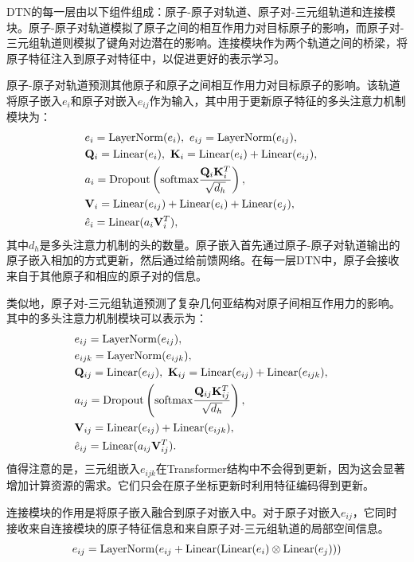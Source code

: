 DTN的每一层由以下组件组成：原子-原子对轨道、原子对-三元组轨道和连接模块。原子-原子对轨道模拟了原子之间的相互作用力对目标原子的影响，而原子对-三元组轨道则模拟了键角对边潜在的影响。连接模块作为两个轨道之间的桥梁，将原子特征注入到原子对特征中，以促进更好的表示学习。

原子-原子对轨道预测其他原子和原子之间相互作用力对目标原子的影响。该轨道将原子嵌入$e_i$和原子对嵌入$e_{ij}$作为输入，其中用于更新原子特征的多头注意力机制模块为：
\begin{eqnarray}
    &e_i = {\rm LayerNorm}(e_i), \ e_{ij} = {\rm LayerNorm}(e_{ij}),& \\
    &\mathbf{Q}_i = {\rm Linear}(e_i), \ \mathbf{K}_i = {\rm Linear}(e_i) + {\rm Linear}(e_{ij}),& \\
    &a_i = {\rm Dropout} \left({\rm softmax} \frac{\mathbf{Q}_i \mathbf{K}_i^T}{\sqrt{d_h}} \right), & \\
    &\mathbf{V}_i = {\rm Linear}(e_{ij}) + {\rm Linear}(e_{i}) + {\rm Linear}(e_{j}),& \\
    &\hat{e}_i = {\rm Linear}(a_i \mathbf{V}_i^T),&
\end{eqnarray}
其中$d_h$是多头注意力机制的头的数量。原子嵌入首先通过原子-原子对轨道输出的原子嵌入相加的方式更新，然后通过给前馈网络。在每一层DTN中，原子会接收来自于其他原子和相应的原子对的信息。

类似地，原子对-三元组轨道预测了复杂几何亚结构对原子间相互作用力的影响。其中的多头注意力机制模块可以表示为：
\begin{eqnarray}
    &e_{ij} = {\rm LayerNorm}(e_{ij}),&\\
    &e_{ijk} = {\rm LayerNorm}(e_{ijk}),&\\
    &\mathbf{Q}_{ij} = {\rm Linear}(e_{ij}), \ \mathbf{K}_{ij} = {\rm Linear}(e_{ij}) + {\rm Linear}(e_{ijk}),& \\
    &a_{ij}= {\rm Dropout} \left({\rm softmax} \frac{\mathbf{Q}_{ij} \mathbf{K}_{ij}^T}{\sqrt{d_h}} \right), & \\
    &\mathbf{V}_{ij} = {\rm Linear}(e_{ij}) + {\rm Linear}(e_{ijk}),& \\
    &\hat{e}_{ij} = {\rm Linear}(a_{ij} \mathbf{V}_{ij}^T).&
\end{eqnarray}
值得注意的是，三元组嵌入$e_{ijk}$在Transformer结构中不会得到更新，因为这会显著增加计算资源的需求。它们只会在原子坐标更新时利用特征编码得到更新。

连接模块的作用是将原子嵌入融合到原子对嵌入中。对于原子对嵌入$e_{ij}$，它同时接收来自连接模块的原子特征信息和来自原子对-三元组轨道的局部空间信息。
\begin{equation}
    e_{ij} = {\rm LayerNorm}(e_{ij} + {\rm Linear}({\rm Linear}(e_i) \otimes {\rm Linear}(e_j)))
\end{equation}

